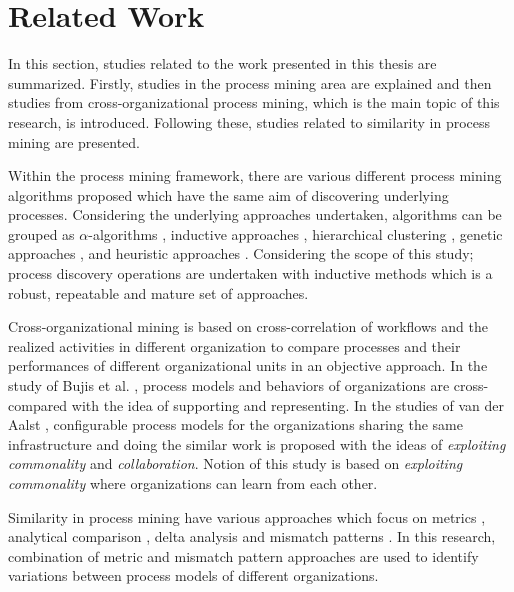 \section{Related Work}
\label{sec:relatedwork}

In this section, studies related to the work presented in this thesis are summarized. Firstly, studies in the process mining area are explained and then studies from cross-organizational process mining, which is the main topic of this research, is introduced. Following these, studies related to similarity in process mining are presented.

Within the process mining framework, there are various different process mining algorithms proposed which have the same aim of discovering underlying processes. Considering the underlying approaches undertaken, algorithms can be grouped as $\alpha$-algorithms \cite{van2004workflow,de2004process}, inductive approaches \cite{herbst1998integrating,herbst2000dealing}, hierarchical clustering \cite{greco2005mining}, genetic approaches \cite{van2005genetic,esgin2010hybrid}, and heuristic approaches \cite{esgin2009hybrid}. Considering the scope of this study; process discovery operations are undertaken with inductive methods which is a robust, repeatable and mature set of approaches.

Cross-organizational mining is based on cross-correlation of workflows and the realized activities in different organization to compare processes and their performances of different organizational units in an objective approach. In the study of Bujis et al. \cite{buijs2012towards}, process models and behaviors of organizations are cross-compared with the idea of supporting and representing. In the studies of van der Aalst \cite{van2011business,van2011intra}, configurable process models for the organizations sharing the same infrastructure and doing the similar work is proposed with the ideas of \textit{exploiting commonality} and \textit{collaboration}. Notion of this study is based on \textit{exploiting commonality} where organizations can learn from each other.

Similarity in process mining have various approaches which focus on metrics \cite{dijkman2011similarity}, analytical comparison \cite{buijs2014comparing}, delta analysis \cite{esgin2011delta,esgin2013sequence} and mismatch patterns \cite{dijkman2007mismatch}. In this research, combination of metric and mismatch pattern approaches are used to identify variations between process models of different organizations.